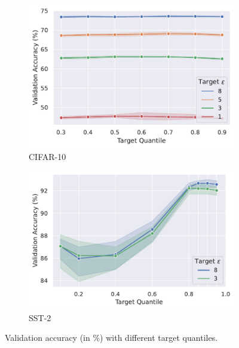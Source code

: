 \begin{figure}
\centering
\begin{subfigure}[!t]{0.5\textwidth}
    \includegraphics[width=\textwidth]{files/fig/ablation_1_cifar_rescale.pdf}
    \caption{CIFAR-10}
    \label{fig:ablation_1_cifar}
\end{subfigure}\hfill
\begin{subfigure}[!t]{0.5\textwidth}
    \includegraphics[width=\textwidth]{files/fig/ablation_1_sst.pdf}
    \caption{SST-2}
    \label{fig:ablation_1_sst2}
\end{subfigure}\hfill

\caption{Validation accuracy (in \%) with different target quantiles.
}
  \label{fig:ablation-1-target-quantile}
\end{figure}


